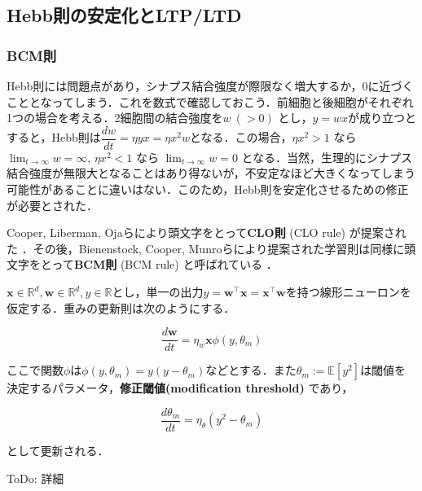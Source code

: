 \subsection{Hebb則の安定化とLTP/LTD}
\subsubsection{BCM則}
Hebb則には問題点があり，シナプス結合強度が際限なく増大するか，0に近づくこととなってしまう．これを数式で確認しておこう．前細胞と後細胞がそれぞれ1つの場合を考える．2細胞間の結合強度を$w\ (>0)$ とし，$y=wx$が成り立つとすると，Hebb則は$\dfrac{dw}{dt}=\eta yx=\eta x^2w$となる．この場合，$\eta x^2>1$ なら $\lim_{t\to\infty} w= \infty$, $\eta x^2<1$ なら $\lim_{t\to\infty} w= 0$ となる．当然，生理的にシナプス結合強度が無限大となることはあり得ないが，不安定なほど大きくなってしまう可能性があることに違いはない．このため，Hebb則を安定化させるための修正が必要とされた．

Cooper, Liberman, Ojaらにより頭文字をとって\textbf{CLO則} (CLO rule) が提案された \cite{Cooper1979-wz}．その後，Bienenstock, Cooper, Munroらにより提案された学習則は同様に頭文字をとって\textbf{BCM則} (BCM rule) と呼ばれている\cite{Bienenstock1982-km} \cite{Cooper2012-ec}．

$\mathbf{x}\in \mathbb{R}^d, \mathbf{w}\in \mathbb{R}^d, y\in \mathbb{R}$とし，単一の出力$y = \mathbf{w}^\top \mathbf{x}=\mathbf{x}^\top \mathbf{w}$を持つ線形ニューロンを仮定する．重みの更新則は次のようにする．


\begin{equation}
\frac{d\mathbf{w}}{dt} = \eta_w \mathbf{x} \phi(y, \theta_m)
\end{equation}


ここで関数$\phi$は$\phi(y, \theta_m)=y(y-\theta_m)$などとする．また$\theta_m:=\mathbb{E}[y^2]$は閾値を決定するパラメータ，\textbf{修正閾値(modification threshold)} であり，


\begin{equation}
\frac{d\theta_m}{dt} = \eta_{\theta} \left(y^2-\theta_m\right)
\end{equation}


として更新される．

ToDo: 詳細
